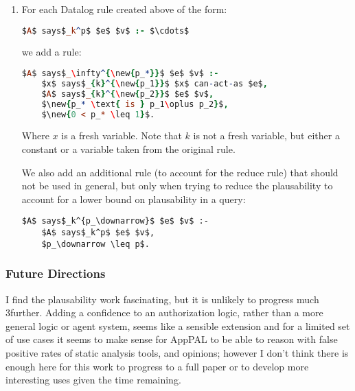 \documentclass[a4paper]{scrartcl}
\newcommand{\new}[1]{{\color{BrickRed}#1}}
\begin{document}
\begin{enumerate}
\begin{enumerate}
  \item
    For each $i\in\left\{1\cdots n\right\}$, we add a Datalog rule
    \begin{lstlisting}[language=Prolog]
$A$ says$_\infty^{\new{p_*}}$ $f^\prime_i$ :-
    $x$ says$_{D_{i-1}}^{\new{p_1}}$ $f^\prime_i$,
    $A$ says$_{\infty}^{\new{p_2}}$ $x$ can-say $D_{i-1}$ $f^\prime_i$,
    $\new{p_* \text{ is } p_1\oplus p_2}$, 
    $\new{0 < p_* \leq 1}$.
    \end{lstlisting}
    Where $x$ is a fresh variable.
  \end{enumerate}
  
  \item
    For each Datalog rule created above of the form:
    \begin{lstlisting}[language=Prolog]
      $A$ says$_k^p$ $e$ $v$ :- $\cdots$
    \end{lstlisting}
    we add a rule:

    \begin{lstlisting}[language=Prolog]
$A$ says$_\infty^{\new{p_*}}$ $e$ $v$ :-
    $x$ says$_{k}^{\new{p_1}}$ $x$ can-act-as $e$,
    $A$ says$_{k}^{\new{p_2}}$ $e$ $v$,
    $\new{p_* \text{ is } p_1\oplus p_2}$, 
    $\new{0 < p_* \leq 1}$.
    \end{lstlisting}
    Where $x$ is a fresh variable.  Note that $k$ is not a fresh variable, but either a constant or a variable taken from the original rule.
    

    \new{
      We also add an additional rule (to account for the reduce rule)
      that should not be used in general, but only when trying to reduce the
      plausability to account for a lower bound on plausability in a query:
      }
      
      \begin{lstlisting}[basicstyle=\color{BrickRed}\ttfamily]
$A$ says$_k^{p_\downarrow}$ $e$ $v$ :- 
    $A$ says$_k^p$ $e$ $v$,
    $p_\downarrow \leq p$.
      \end{lstlisting}
\end{enumerate}

\subsubsection*{Future Directions}

I find the plausability work fascinating, but it is unlikely to progress much
3further.  Adding a confidence to an authorization logic, rather than a more
general logic or agent system, seems like a sensible extension and for a limited
set of use cases it seems to make sense for AppPAL to be able to reason with false
positive rates of static analysis tools, and opinions; however I don't think
there is enough here for this work to progress to a full paper or to develop
more interesting uses given the time remaining.
\end{document}
